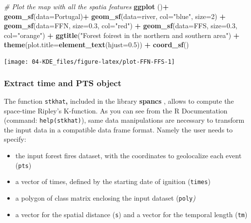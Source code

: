 \documentclass[
]{article}
\newenvironment{Shaded}{\begin{snugshade}}{\end{snugshade}}
\newcommand{\AttributeTok}[1]{\textcolor[rgb]{0.13,0.29,0.53}{#1}}
\newcommand{\CommentTok}[1]{\textcolor[rgb]{0.56,0.35,0.01}{\textit{#1}}}
\newcommand{\DecValTok}[1]{\textcolor[rgb]{0.00,0.00,0.81}{#1}}
\newcommand{\FloatTok}[1]{\textcolor[rgb]{0.00,0.00,0.81}{#1}}
\newcommand{\FunctionTok}[1]{\textcolor[rgb]{0.13,0.29,0.53}{\textbf{#1}}}
\newcommand{\NormalTok}[1]{#1}
\newcommand{\SpecialCharTok}[1]{\textcolor[rgb]{0.81,0.36,0.00}{\textbf{#1}}}
\newcommand{\StringTok}[1]{\textcolor[rgb]{0.31,0.60,0.02}{#1}}
\providecommand{\tightlist}{%
  \setlength{\itemsep}{0pt}\setlength{\parskip}{0pt}}
\begin{document}
\begin{Shaded}
\begin{Highlighting}[]
\CommentTok{\# Plot the map with all the spatia features}
\FunctionTok{ggplot}\NormalTok{ ()}\SpecialCharTok{+}
  \FunctionTok{geom\_sf}\NormalTok{(}\AttributeTok{data=}\NormalTok{Portugal)}\SpecialCharTok{+}
  \FunctionTok{geom\_sf}\NormalTok{(}\AttributeTok{data=}\NormalTok{river, }\AttributeTok{col=}\StringTok{"blue"}\NormalTok{, }\AttributeTok{size=}\DecValTok{2}\NormalTok{) }\SpecialCharTok{+}
  \FunctionTok{geom\_sf}\NormalTok{(}\AttributeTok{data=}\NormalTok{FFN, }\AttributeTok{size=}\FloatTok{0.3}\NormalTok{, }\AttributeTok{col=}\StringTok{"red"}\NormalTok{) }\SpecialCharTok{+}
  \FunctionTok{geom\_sf}\NormalTok{(}\AttributeTok{data=}\NormalTok{FFS, }\AttributeTok{size=}\FloatTok{0.3}\NormalTok{, }\AttributeTok{col=}\StringTok{"orange"}\NormalTok{) }\SpecialCharTok{+}
  \FunctionTok{ggtitle}\NormalTok{(}\StringTok{"Forest foirest in the northern and southern area"}\NormalTok{) }\SpecialCharTok{+}
  \FunctionTok{theme}\NormalTok{(}\AttributeTok{plot.title=}\FunctionTok{element\_text}\NormalTok{(}\AttributeTok{hjust=}\FloatTok{0.5}\NormalTok{)) }\SpecialCharTok{+}
 \FunctionTok{coord\_sf}\NormalTok{()}
\end{Highlighting}
\end{Shaded}

\begin{center}\texttt{[image: 04-KDE\_files/figure-latex/plot-FFN-FFS-1]} \end{center}

\subsubsection{Extract time and PTS object}\label{extract-time-and-pts-object}

The function \texttt{stkhat}\textbf{,} included in the library \textbf{spancs} \citep{Rowlingson_2024}, allows to compute the space-time Ripley's K-function.
As you can see from the R Documentation (command: \texttt{help(stkhat)}), same data manipulations are necessary to transform the input data in a compatible data frame format.
Namely the user needs to specify:

\begin{itemize}
\tightlist
\item
  the input forest fires dataset, with the coordinates to geolocalize each event (\texttt{pts})
\item
  a vector of times, defined by the starting date of ignition (\texttt{times})
\item
  a polygon of class matrix enclosing the input dataset (\texttt{poly}\emph{)}
\item
  a vector for the spatial distance (\texttt{s}) and a vector for the temporal length (\texttt{tm})
\end{itemize}
\end{document}
